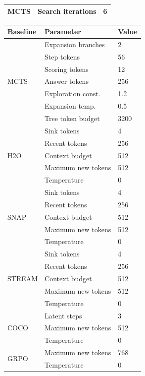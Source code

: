 \begin{table}[!t]
\begin{minipage}[t]{0.49\textwidth}
\begin{tabular}{lll}
MCTS & Search iterations & 6 \\ 
\bottomrule
\end{tabular}
\end{minipage}
\hfill
\begin{minipage}[t]{0.49\textwidth}
\centering
\begin{tabular}{lll}
\toprule
\textbf{Baseline} & \textbf{Parameter} & \textbf{Value} \\
\midrule

\multirow{7}{*}{MCTS} 
& Expansion branches & 2 \\
& Step tokens & 56 \\
& Scoring tokens & 12 \\
& Answer tokens & 256 \\
& Exploration const. & 1.2 \\
& Expansion temp. & 0.5 \\
& Tree token budget & 3200 \\
\midrule

\multirow{5}{*}{H2O}
& Sink tokens & 4 \\
& Recent tokens & 256 \\
& Context budget & 512 \\
& Maximum new tokens & 512 \\
& Temperature & 0 \\
\midrule

\multirow{5}{*}{SNAP}
& Sink tokens & 4 \\
& Recent tokens & 256 \\
& Context budget & 512 \\
& Maximum new tokens & 512 \\
& Temperature & 0 \\
\midrule

\multirow{5}{*}{STREAM}
& Sink tokens & 4 \\
& Recent tokens & 256 \\
& Context budget & 512 \\
& Maximum new tokens & 512 \\
& Temperature & 0 \\
\midrule

\multirow{3}{*}{COCO}
& Latent steps & 3 \\
& Maximum new tokens & 512 \\
& Temperature & 0 \\
\midrule

\multirow{2}{*}{GRPO}
& Maximum new tokens & 768 \\
& Temperature & 0 \\
\bottomrule
\end{tabular}
\end{minipage}
\vspace{-3mm}
\end{table}

